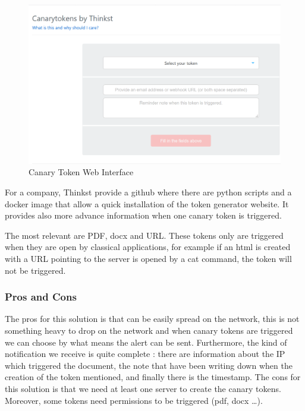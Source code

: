 \documentclass{tnreport}
\begin{document}
\begin{figure}[h!]
  \begin{center}
  \includegraphics[scale=0.7]{figures/Canary}
  \caption{Canary Token Web Interface \cite{lib22}}
  \label{fig:canary}
  \end{center}
\end{figure}


For a company, Thinkst provide a github where there are python scripts and a docker image that allow a quick installation of the token generator website. It provides also more advance information when one canary token is triggered. 


The most relevant are PDF, docx and URL. These tokens only are triggered when they are open by classical applications, for example if an html is created with a URL pointing to the server is opened by a cat command, the token will not be triggered.

\subsubsection{Pros and Cons}
The pros for this solution is that can be easily spread on the network, this is not something heavy to drop on the network and when canary tokens are triggered we can choose by what means the alert can be sent. Furthermore, the kind of notification we receive is quite complete : there are information about the IP which triggered the document, the note that have been writing down when the creation of the token mentioned, and finally there is the timestamp.
The cons for this solution is that we need at least one server to create the canary tokens. Moreover, some tokens need permissions to be triggered (pdf, docx …).
\end{document}
